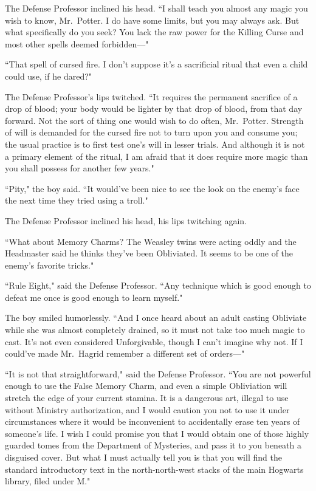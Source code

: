 The Defense Professor inclined his head. ``I shall teach you almost any magic you wish to know, Mr.~Potter. I do have some limits, but you may always ask. But what specifically do you seek? You lack the raw power for the Killing Curse and most other spells deemed forbidden---"

``That spell of cursed fire. I don't suppose it's a sacrificial ritual that even a child could use, if he dared?"

The Defense Professor's lips twitched. ``It requires the permanent sacrifice of a drop of blood; your body would be lighter by that drop of blood, from that day forward. Not the sort of thing one would wish to do often, Mr.~Potter. Strength of will is demanded for the cursed fire not to turn upon you and consume you; the usual practice is to first test one's will in lesser trials. And although it is not a primary element of the ritual, I am afraid that it does require more magic than you shall possess for another few years."

``Pity," the boy said. ``It would've been nice to see the look on the enemy's face the next time they tried using a troll."

The Defense Professor inclined his head, his lips twitching again.

``What about Memory Charms? The Weasley twins were acting oddly and the Headmaster said he thinks they've been Obliviated. It seems to be one of the enemy's favorite tricks."

``Rule Eight," said the Defense Professor. ``Any technique which is good enough to defeat me once is good enough to learn myself."

The boy smiled humorlessly. ``And I once heard about an adult casting Obliviate while she was almost completely drained, so it must not take too much magic to cast. It's not even considered Unforgivable, though I can't imagine why not. If I could've made Mr.~Hagrid remember a different set of orders---"

``It is not that straightforward," said the Defense Professor. ``You are not powerful enough to use the False Memory Charm, and even a simple Obliviation will stretch the edge of your current stamina. It is a dangerous art, illegal to use without Ministry authorization, and I would caution you not to use it under circumstances where it would be inconvenient to accidentally erase ten years of someone's life. I wish I could promise you that I would obtain one of those highly guarded tomes from the Department of Mysteries, and pass it to you beneath a disguised cover. But what I must actually tell you is that you will find the standard introductory text in the north-north-west stacks of the main Hogwarts library, filed under M."

